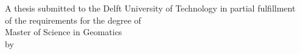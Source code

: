 \thispagestyle{empty}

\begin{titlepage}
  \begin{addmargin}[-1cm]{-3cm}
    \begin{center}
    	
        \large  
        \hfill
        \vfill


        \begingroup
            \color{tudelft}\spacedallcaps{\myTitle}
        \endgroup

        \vspace{5cm}
        
        A thesis submitted to the Delft University of Technology in partial fulfillment\\ of the requirements for the degree of\\
        \vspace{2cm}
        Master of Science in Geomatics\\
        \vspace{4cm}
        by\\
        \bigskip
        \myName\\
        \bigskip
        \myGraduationMonth\xspace\myGraduationYear\\

        \vfill

    \end{center}  
  \end{addmargin}       
\end{titlepage}  








